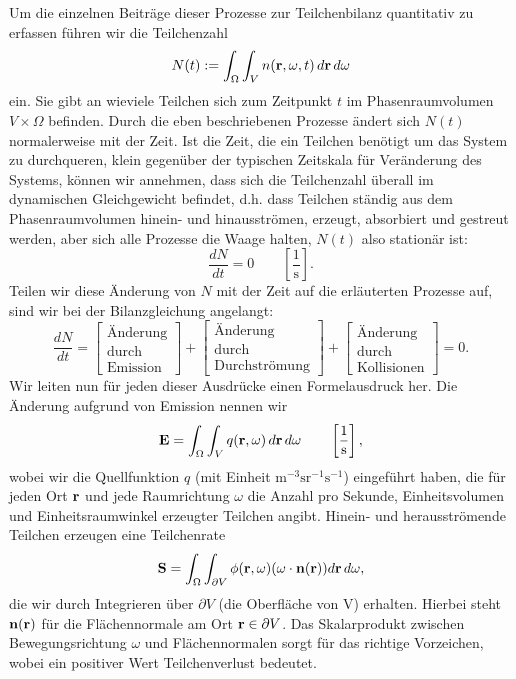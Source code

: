 	Um die einzelnen Beiträge dieser Prozesse zur Teilchenbilanz quantitativ zu erfassen führen wir die Teilchenzahl $$N(t):=\int_\Omega \int_V n(\mathbf{r},\omega,t)\,d\mathbf{r}\,d\omega$$ ein. Sie gibt an wieviele Teilchen sich zum Zeitpunkt $t$ im Phasenraumvolumen $V \times \Omega$ befinden. Durch die eben beschriebenen Prozesse ändert sich $N(t)$ normalerweise mit der Zeit. Ist die Zeit, die ein Teilchen benötigt um das System zu durchqueren, klein gegenüber der typischen Zeitskala für Veränderung des Systems, können wir annehmen, dass sich die Teilchenzahl überall im dynamischen Gleichgewicht befindet, d.h. dass Teilchen ständig aus dem Phasenraumvolumen hinein- und hinausströmen, erzeugt, absorbiert und gestreut werden, aber sich alle Prozesse die Waage halten, $N(t)$ also stationär ist:$$\frac{dN}{dt}=0\qquad\left[\frac{1}{\text{s}}\right].$$ Teilen wir diese Änderung von $N$ mit der Zeit auf die erläuterten Prozesse auf, sind wir bei der Bilanzgleichung angelangt:$$\frac{dN}{dt}=\begin{bmatrix}\text{Änderung}\\ \text{durch}\\ \text{Emission}\end{bmatrix}+\begin{bmatrix}\text{Änderung}\\ \text{durch}\\ \text{Durchströmung}\end{bmatrix}+\begin{bmatrix}\text{Änderung}\\ \text{durch}\\ \text{Kollisionen}\end{bmatrix}=0.$$ Wir leiten nun für jeden dieser Ausdrücke einen Formelausdruck her.
	Die Änderung aufgrund von Emission nennen wir $$\mathbf{E}=\int_\Omega \int_V q(\mathbf{r},\omega)\,d\mathbf{r}\,d\omega\qquad\left[\frac{1}{\text{s}}\right],$$ wobei wir die Quellfunktion $q$ (mit Einheit $\text{m}^{-3}\text{sr}^{-1}\text{s}^{-1}$) eingeführt haben, die für jeden Ort $\mathbf{r}$ und jede Raumrichtung $\omega$ die Anzahl pro Sekunde, Einheitsvolumen und Einheitsraumwinkel erzeugter Teilchen angibt. Hinein- und herausströmende Teilchen erzeugen eine Teilchenrate
	$$\mathbf{S}=\int_\Omega \int_{\partial V} \phi(\mathbf{r},\omega)(\omega \cdot \mathbf{n}(\mathbf{r}))d\mathbf{r}\,d\omega,$$
	die wir durch Integrieren über $\partial V$ (die Oberfläche von V) erhalten. Hierbei steht $\mathbf{n}(\mathbf{r})$ für die Flächennormale am Ort $\mathbf{r}\in\partial V$. Das Skalarprodukt zwischen Bewegungsrichtung $\omega$ und Flächennormalen sorgt für das richtige Vorzeichen, wobei ein positiver Wert Teilchenverlust bedeutet.
